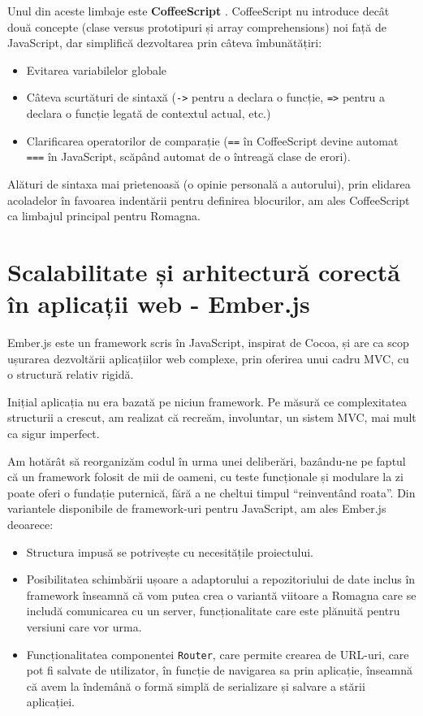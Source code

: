 \documentclass[12pt, a4paper, twoside, romanian]{teza-upb}
\begin{document}
    Unul din aceste limbaje este \textbf{CoffeeScript} \cite{ashkenas:2012:coffeescript}. CoffeeScript nu introduce decât două concepte (clase versus prototipuri și array comprehensions) noi față de JavaScript, dar simplifică dezvoltarea prin câteva îmbunătățiri:
    \begin{itemize}
      \item Evitarea variabilelor globale
      \item Câteva scurtături de sintaxă (\verb=->= pentru a declara o funcție, \verb~=>~ pentru a declara o funcție legată de contextul actual, etc.) 
      \item Clarificarea operatorilor de comparație (\verb~==~ în CoffeeScript devine automat \verb~===~ în JavaScript, scăpând automat de o întreagă clase de erori).
    \end{itemize}
        Alături de sintaxa mai prietenoasă (o opinie personală a autorului), prin elidarea acoladelor în favoarea indentării pentru definirea blocurilor, am ales CoffeeScript ca limbajul principal pentru Romagna.

  \section{Scalabilitate și arhitectură corectă în aplicații web - Ember.js}
    Ember.js este un framework scris în JavaScript, inspirat de Cocoa, și are ca scop ușurarea dezvoltării aplicațiilor web complexe, prin oferirea unui cadru MVC, cu o structură relativ rigidă. 
    
    Inițial aplicația nu era bazată pe niciun framework. Pe măsură ce complexitatea structurii a crescut, am realizat că recreăm, involuntar, un sistem MVC, mai mult ca sigur imperfect.
   
    Am hotărât să reorganizăm codul în urma unei deliberări, bazându-ne pe faptul că un framework folosit de mii de oameni, cu teste funcționale și modulare la zi poate oferi o fundație puternică, fără a ne cheltui timpul ``reinventând roata''. Din variantele disponibile de framework-uri pentru JavaScript, am ales Ember.js deoarece:
    \begin{itemize}
      \item Structura impusă se potrivește cu necesitățile proiectului.
      \item Posibilitatea schimbării ușoare a adaptorului a repozitoriului de date inclus în framework înseamnă că vom putea crea o variantă viitoare a Romagna care se includă comunicarea cu un server, funcționalitate care este plănuită pentru versiuni care vor urma.
      \item Funcționalitatea componentei \verb=Router=, care permite crearea de URL-uri, care pot fi salvate de utilizator, în funcție de navigarea sa prin aplicație, înseamnă că avem la îndemână o formă simplă de serializare și salvare a stării aplicației.
    \end{itemize}
\end{document}
